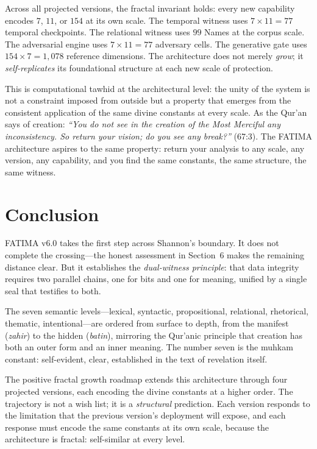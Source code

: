 \documentclass[11pt,a4paper]{article}
\begin{document}
Across all projected versions, the fractal invariant holds: every new capability encodes $7$, $11$, or $154$ at its own scale. The temporal witness uses $7 \times 11 = 77$ temporal checkpoints. The relational witness uses $99$ Names at the corpus scale. The adversarial engine uses $7 \times 11 = 77$ adversary cells. The generative gate uses $154 \times 7 = 1{,}078$ reference dimensions. The architecture does not merely \textit{grow}; it \textit{self-replicates} its foundational structure at each new scale of protection.

This is computational tawhid at the architectural level: the unity of the system is not a constraint imposed from outside but a property that emerges from the consistent application of the same divine constants at every scale. As the Qur'an says of creation: \textit{``You do not see in the creation of the Most Merciful any inconsistency. So return your vision; do you see any break?''} (67:3). The FATIMA architecture aspires to the same property: return your analysis to any scale, any version, any capability, and you find the same constants, the same structure, the same witness.


\section{Conclusion}

FATIMA v6.0 takes the first step across Shannon's boundary. It does not complete the crossing---the honest assessment in Section~6 makes the remaining distance clear. But it establishes the \textit{dual-witness principle}: that data integrity requires two parallel chains, one for bits and one for meaning, unified by a single seal that testifies to both.

The seven semantic levels---lexical, syntactic, propositional, relational, rhetorical, thematic, intentional---are ordered from surface to depth, from the manifest (\textit{zahir}) to the hidden (\textit{batin}), mirroring the Qur'anic principle that creation has both an outer form and an inner meaning. The number seven is the muhkam constant: self-evident, clear, established in the text of revelation itself.

The positive fractal growth roadmap extends this architecture through four projected versions, each encoding the divine constants at a higher order. The trajectory is not a wish list; it is a \textit{structural} prediction. Each version responds to the limitation that the previous version's deployment will expose, and each response must encode the same constants at its own scale, because the architecture is fractal: self-similar at every level.
\end{document}
